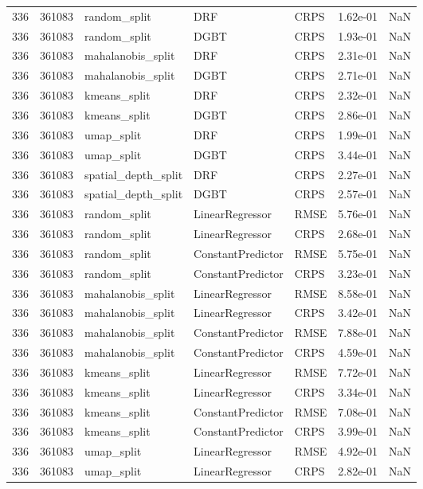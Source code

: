 \begin{tabular}{rrlllrr}
336 & 361083 & random\_split & DRF & CRPS & 1.62e-01 & NaN \\
336 & 361083 & random\_split & DGBT & CRPS & 1.93e-01 & NaN \\
336 & 361083 & mahalanobis\_split & DRF & CRPS & 2.31e-01 & NaN \\
336 & 361083 & mahalanobis\_split & DGBT & CRPS & 2.71e-01 & NaN \\
336 & 361083 & kmeans\_split & DRF & CRPS & 2.32e-01 & NaN \\
336 & 361083 & kmeans\_split & DGBT & CRPS & 2.86e-01 & NaN \\
336 & 361083 & umap\_split & DRF & CRPS & 1.99e-01 & NaN \\
336 & 361083 & umap\_split & DGBT & CRPS & 3.44e-01 & NaN \\
336 & 361083 & spatial\_depth\_split & DRF & CRPS & 2.27e-01 & NaN \\
336 & 361083 & spatial\_depth\_split & DGBT & CRPS & 2.57e-01 & NaN \\
336 & 361083 & random\_split & LinearRegressor & RMSE & 5.76e-01 & NaN \\
336 & 361083 & random\_split & LinearRegressor & CRPS & 2.68e-01 & NaN \\
336 & 361083 & random\_split & ConstantPredictor & RMSE & 5.75e-01 & NaN \\
336 & 361083 & random\_split & ConstantPredictor & CRPS & 3.23e-01 & NaN \\
336 & 361083 & mahalanobis\_split & LinearRegressor & RMSE & 8.58e-01 & NaN \\
336 & 361083 & mahalanobis\_split & LinearRegressor & CRPS & 3.42e-01 & NaN \\
336 & 361083 & mahalanobis\_split & ConstantPredictor & RMSE & 7.88e-01 & NaN \\
336 & 361083 & mahalanobis\_split & ConstantPredictor & CRPS & 4.59e-01 & NaN \\
336 & 361083 & kmeans\_split & LinearRegressor & RMSE & 7.72e-01 & NaN \\
336 & 361083 & kmeans\_split & LinearRegressor & CRPS & 3.34e-01 & NaN \\
336 & 361083 & kmeans\_split & ConstantPredictor & RMSE & 7.08e-01 & NaN \\
336 & 361083 & kmeans\_split & ConstantPredictor & CRPS & 3.99e-01 & NaN \\
336 & 361083 & umap\_split & LinearRegressor & RMSE & 4.92e-01 & NaN \\
336 & 361083 & umap\_split & LinearRegressor & CRPS & 2.82e-01 & NaN \\

\end{tabular}
